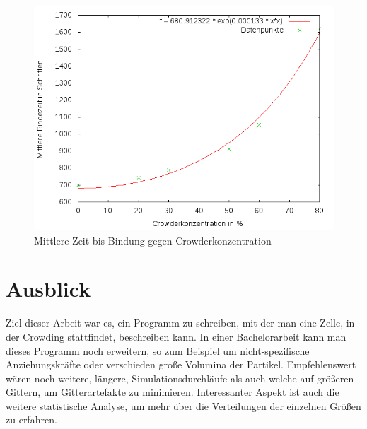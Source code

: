 \documentclass[bachelor,       %
               twoside,        %
               BCOR10mm,       %
               english,ngerman, %
               ]{GAUBM}
\begin{document}
\begin{figure}
  \centering
  \includegraphics[width=0.9\linewidth]{suchzeitgegencrowder.png}
  \caption{Mittlere Zeit bis Bindung gegen Crowderkonzentration}
  \label{fig:suchgegencrowder}
\end{figure}



\chapter{Ausblick}
Ziel dieser Arbeit war es, ein Programm zu schreiben, mit der man eine Zelle,
in der Crowding stattfindet, beschreiben kann. In einer Bachelorarbeit kann man
dieses Programm noch erweitern, so zum Beispiel um nicht-spezifische Anziehungskräfte oder
verschieden große Volumina der Partikel. Empfehlenswert wären noch weitere, längere,
Simulationsdurchläufe als auch welche auf größeren Gittern, um Gitterartefakte zu
minimieren. Interessanter Aspekt ist auch die weitere statistische Analyse, um mehr
über die Verteilungen der einzelnen Größen zu erfahren.


\cleardoublepage



\end{document}

